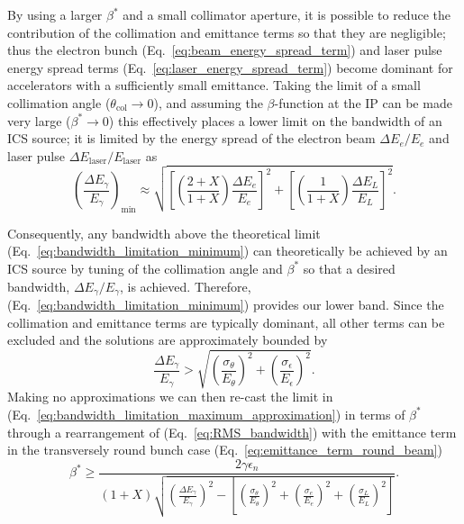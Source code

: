 \documentclass[../main.tex]{subfiles}
\begin{document}
By using a larger $\beta^{*}$ and a small collimator aperture, it is possible to reduce the contribution of the collimation and emittance terms so that they are negligible; thus the electron bunch (Eq.~\ref{eq:beam_energy_spread_term}) and laser pulse energy spread terms (Eq.~\ref{eq:laser_energy_spread_term}) become dominant for accelerators with a sufficiently small emittance. Taking the limit of a small collimation angle ($\theta_{\mathrm{col}}\rightarrow 0$), and assuming the $\beta$-function at the IP can be made very large ($\beta^{*}\rightarrow 0$) this effectively places a lower limit on the bandwidth of an ICS source; it is limited by the energy spread of the electron beam $\Delta E_{e}/E_{e}$ and laser pulse $\Delta E_{\mathrm{laser}}/E_{\mathrm{laser}}$ as 
\begin{equation}
\left(\frac{\Delta E_{\gamma}}{E_{\gamma}}\right)_{\mathrm{min}} \approx \sqrt{\left[\left(\frac{2+X}{1+X}\right)\frac{\Delta E_{e}}{E_{e}}\right]^{2} + \left[\left(\frac{1}{1+X}\right)\frac{\Delta E_{L}}{E_{L}}\right]^{2}}.
\label{eq:bandwidth_limitation_minimum}
\end{equation}

Consequently, any bandwidth above the theoretical limit (Eq.~\ref{eq:bandwidth_limitation_minimum}) can theoretically be achieved by an ICS source by tuning of the collimation angle and $\beta^{*}$ so that a desired bandwidth, $\Delta E_{\gamma}/E_{\gamma}$, is achieved. Therefore, (Eq.~\ref{eq:bandwidth_limitation_minimum}) provides our lower band. Since the collimation and emittance terms are typically dominant, all other terms can be excluded and the solutions are approximately bounded by
\begin{equation}
\frac{\Delta E_{\gamma}}{E_{\gamma}} > \sqrt{\left(\frac{ \sigma_{\theta}}{E_{\theta}}\right)^{2}+\left(\frac{\sigma_{\epsilon}}{E_{\epsilon}}\right)^{2}}.
\label{eq:bandwidth_limitation_maximum_approximation}
\end{equation}
Making no approximations we can then re-cast the limit in (Eq.~\ref{eq:bandwidth_limitation_maximum_approximation}) in terms of $\beta^{*}$ through a rearrangement of (Eq.~\ref{eq:RMS_bandwidth}) with the emittance term in the transversely round bunch case (Eq.~\ref{eq:emittance_term_round_beam})
\begin{equation}
\beta^{*} \geq \frac{2\gamma\epsilon_{n}}{\left(1+X\right)\sqrt{\left(\frac{\Delta E_{\gamma}}{E_{\gamma}}\right)^{2}-\left[\left(\frac{\sigma_{\theta}}{E_{\theta}}\right)^{2}+\left(\frac{\sigma_{e}}{E_{e}}\right)^{2}+\left(\frac{\sigma_{L}}{E_{L}}\right)^{2}\right]}}.
\label{eq:beta_star_maximum limitation}
\end{equation}
\end{document}
